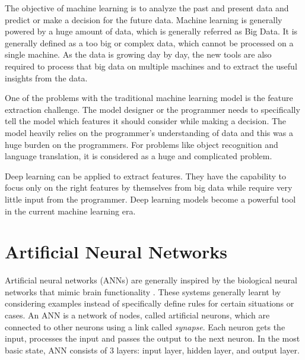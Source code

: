 The objective of machine learning is to analyze the past and present data and predict or make a decision for the future data. Machine learning is generally powered by a huge amount of data, which is generally referred as Big Data. It is generally defined as a too big or complex data, which cannot be processed on a single machine. As the data is growing day by day, the new tools are also required to process that big data on multiple machines and to extract the useful insights from the data.


One of the problems with the traditional machine learning model is the feature extraction challenge. The model designer or the programmer needs to specifically tell the model which features it should consider while making a decision. The model heavily relies on the programmer's understanding of data and this was a huge burden on the programmers. For problems like object recognition and language translation, it is considered as a huge and complicated problem.

Deep learning can be applied to extract features. They have the capability to focus only on the right features by themselves from big data while require very little input from the programmer. Deep learning models become a powerful tool in the current machine learning era.


\section{Artificial Neural Networks}
Artificial neural networks (ANNs) are generally inspired by the biological neural networks that mimic brain functionality \cite{wiki:ann}. These systems generally learnt by considering examples instead of specifically define rules for certain situations or cases. An ANN is a network of nodes, called artificial neurons, which are connected to other neurons using a link called \textit{synapse}. Each neuron gets the input, processes the input and passes the output to the next neuron.
In the most basic state, ANN consists of 3 layers: input layer, hidden layer, and output layer.


